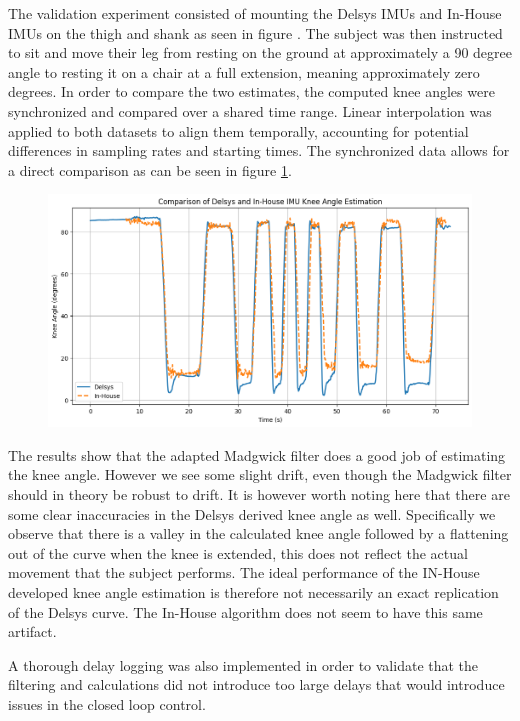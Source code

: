 The validation experiment consisted of mounting the Delsys IMUs and In-House IMUs on the thigh and shank as seen in figure . The subject was then instructed to sit and move their leg from resting on the ground at approximately a 90 degree angle to resting it on a chair at a full extension, meaning approximately zero degrees. In order to compare the two estimates, the computed knee angles were synchronized and compared over a shared time range. Linear interpolation was applied to both datasets to align them temporally, accounting for potential differences in sampling rates and starting times. The synchronized data allows for a direct comparison as can be seen in figure \ref{fig:t11}. 

\begin{figure} [H]
    \centering
    \includegraphics[width=0.95\linewidth]{images/T11_betterplotting.png}
    \caption{}
    \label{fig:t11}
\end{figure}

The results show that the adapted Madgwick filter does a good job of estimating the knee angle. However we see some slight drift, even though the Madgwick filter should in theory be robust to drift. It is however worth noting here that there are some clear inaccuracies in the Delsys derived knee angle as well. Specifically we observe that there is a valley in the calculated knee angle followed by a flattening out of the curve when the knee is extended, this does not reflect the actual movement that the subject performs. The ideal performance of the IN-House developed knee angle estimation is therefore not necessarily an exact replication of the Delsys curve. The In-House algorithm does not seem to have this same artifact.

A thorough delay logging was also implemented in order to validate that the filtering and calculations did not introduce too large delays that would introduce issues in the closed loop control. 



